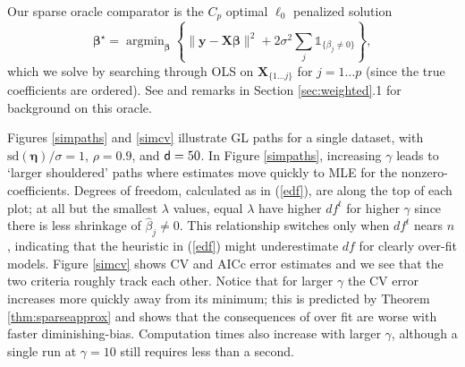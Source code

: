 \documentclass[12pt]{article}
\newcommand{\bs}[1]{\boldsymbol{#1}}
\newcommand{\mr}[1]{\mathrm{#1}}
\newcommand{\bm}[1]{\mathbf{#1}}
\newcommand{\ds}[1]{\mathds{#1}}
\DeclareMathOperator*{\argmin}{argmin}
\begin{document}
Our sparse oracle comparator is the $C_p$ optimal $\ell_0$ penalized solution
\begin{equation}\label{l0oracle}
\bs{\beta}^{\star} = \argmin_{\bs{\beta}} \left\{ \|\bm{y}-\bm{X}\bs{\beta}\|^2 + 2\sigma^2\sum_j
\ds{1}_{\{\beta_j\neq0\}}\right\},
\end{equation} which we solve by searching through
OLS on $\bm{X}_{\{1\ldots j\}}$ for $j=1\ldots p$ (since the true coefficients are ordered).
See \cite{mallows_comments_1973} and remarks in Section \ref{sec:weighted}.1 for background on this oracle.


Figures \ref{simpaths} and \ref{simcv} illustrate GL paths for a single
dataset, with  $\mr{sd}(\bm{\eta})/\sigma=1$, $\rho=0.9$, and ${\sf d}=50$. In Figure
\ref{simpaths}, increasing $\gamma$ leads to `larger shouldered' paths where
estimates move quickly to MLE for the nonzero-coefficients. Degrees of
freedom, calculated as in (\ref{edf}), are along the top of each plot; at all but the smallest $\lambda$ values, equal
$\lambda$ have higher $df^t$ for higher $\gamma$ since there is less shrinkage
of $\hat\beta_j\neq0$.   This relationship switches only when $df^t$
nears $n$, indicating that the heuristic in (\ref{edf}) might underestimate $df$ for clearly over-fit models.
Figure \ref{simcv} shows CV and AICc error estimates and we see that 
the two criteria roughly track each other.  Notice that
for larger $\gamma$ the CV error increases more quickly away from
its minimum; this is predicted by Theorem \ref{thm:sparseapprox} and shows that the consequences of over fit are worse with
faster diminishing-bias.  Computation times also increase with larger $\gamma$, although a
single run at $\gamma=10$ still requires less than a second.
\end{document}
